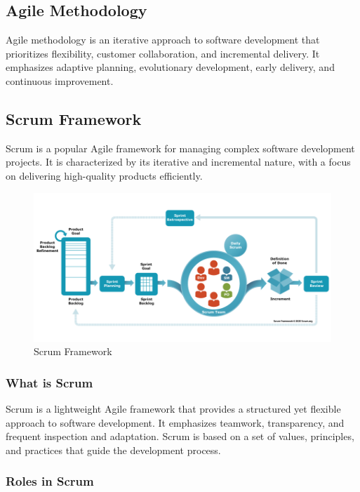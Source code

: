 \subsection{Agile Methodology}

Agile methodology is an iterative approach to software development that
prioritizes flexibility, customer collaboration, and incremental delivery. It
emphasizes adaptive planning, evolutionary development, early delivery, and
continuous improvement.

\subsection{Scrum Framework}

Scrum is a popular Agile framework for managing complex software development
projects. It is characterized by its iterative and incremental nature, with a
focus on delivering high-quality products efficiently.

\begin{figure}
      \centering
      \includegraphics[width=1\textwidth]{images/scrum.png}
      \caption{Scrum Framework}
      \label{fig:Scrum Framework}
\end{figure}

\subsubsection{What is Scrum}

Scrum is a lightweight Agile framework that provides a structured yet flexible
approach to software development. It emphasizes teamwork, transparency, and
frequent inspection and adaptation. Scrum is based on a set of values,
principles, and practices that guide the development process.

\subsubsection{Roles in Scrum}

